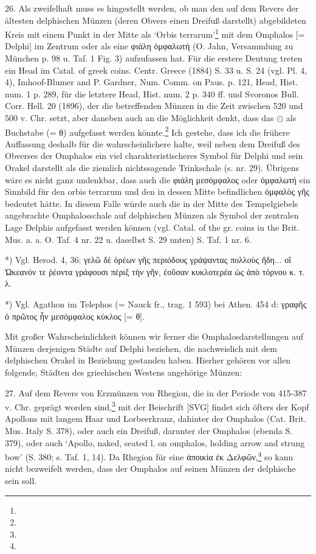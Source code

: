 \documentclass[a4paper, 11pt, oneside]{article}
\begin{document}
26. Als zweifelhaft muss es hingestellt werden, ob man den auf dem Revers der ältesten delphischen Münzen (deren Obvers einen Dreifuß darstellt) abgebildeten Kreis mit einem Punkt in der Mitte als `Orbis terrarum'\footnote{} mit dem Omphalos [= Delphi] im Zentrum oder als eine φιάλη ὀμφαλωτή (O. Jahn, Versammlung zu München p. 98 u. Taf. 1 Fig. 3) aufzufassen hat. Für die erstere Deutung treten ein Head im Catal. of greek coins. Centr. Greece (1884) S. 33 u. S. 24 (vgl. Pl. 4, 4), Imhoof-Blumer and P. Gardner, Num. Comm. on Paus. p. 121, Head, Hist. num. 1 p. 289, für die letztere Head, Hist. num. 2 p. 340 ff. und Svoronos Bull. Corr. Hell. 20 (1896), der die betreffenden Münzen in die Zeit zwischen 520 und 500 v. Chr. setzt, aber daneben auch an die Möglichkeit denkt, dass das $\odot$ als Buchstabe (= θ) aufgefasst werden könnte.\footnote{} Ich gestehe, dass ich die frühere Auffassung deshalb für die wahrscheinlichere halte, weil neben dem Dreifuß des Obverses der Omphalos ein viel charakteristischeres Symbol für Delphi und sein Orakel darstellt als die ziemlich nichtssagende Trinkschale (s. nr. 29). Übrigens wäre es nicht ganz undenkbar, dass auch die φιάλη μεσόμφαλος oder ὀμφαλωτή ein Sinnbild für den orbis terrarum und den in dessen Mitte befindlichen ὀμφαλὸς γῆς bedeutet hätte. In diesem Falle würde auch die in der Mitte des Tempelgiebels angebrachte Omphalosschale auf delphischen Münzen als Symbol der zentralen Lage Delphis aufgefasst werden können (vgl. Catal. of the gr. coins in the Brit. Mus. a. a. O. Taf. 4 nr. 22 u. daselbst S. 29 unten) S. Taf. 1 nr. 6.

*) Vgl. Herod. 4, 36: γελῶ δὲ ὁρέων γῆς περιόδους γράψαντας πολλοὺς ἤδη... οἳ Ὠκεανόν τε ῥέοντα γράφουσι πέριξ τὴν γῆν, ἐοῦσαν κυκλοτερέα ὡς ἀπὸ τόρνου κ. τ. λ.

*) Vgl. Agathon im Telephos (= Nauck fr., trag. 1 593) bei Athen. 454 d: γραφῆς ὁ πρῶτος ἦν μεσόμφαλος κύκλος [= θ].

Mit großer Wahrscheinlichkeit können wir ferner die Omphalosdarstellungen auf Münzen derjenigen Städte auf Delphi beziehen, die nachweislich mit dem delphischen Orakel in Beziehung gestanden haben. Hierher gehören vor allen folgende, Städten des griechischen Westens angehörige Münzen:

27. Auf dem Revers von Erzmünzen von Rhegion, die in der Periode von 415-387 v. Chr. geprägt worden sind,\footnote{} mit der Beischrift [SVG] findet sich öfters der Kopf Apollons mit langem Haar und Lorbeerkranz, dahinter der Omphalos (Cat. Brit. Mus. Italy S. 378), oder auch ein Dreifuß, darunter der Omphalos (ebenda S. 379), oder auch `Apollo, naked, seated l. on omphalos, holding arrow and strung bow' (S. 380; s. Taf. 1, 14). Da Rhegion für eine ἀποικία ἐκ Δελφῶν,\footnote{} so kann nicht bezweifelt werden, dass der Omphalos auf seinen Münzen der delphische sein soll.
\end{document}
